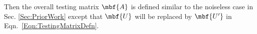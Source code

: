 \documentclass[conference,twocolumn]{IEEEtran}
\begin{document}
Then the overall testing matrix $\mbf{A}$ is defined similar to the noiseless case in Sec. \ref{Sec:PriorWork} except that $\mbf{U}$ will be replaced by $\mbf{U'}$ in Eqn.~\eqref{Eqn:TestingMatrixDefn}.  %
\end{document}
